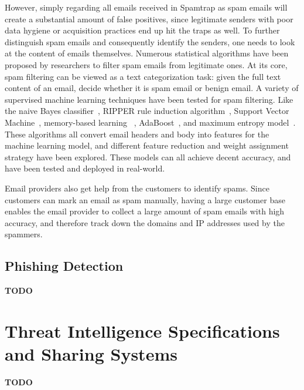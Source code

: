 However, simply regarding all emails received in Spamtrap as spam emails 
will create a substantial amount of false positives, since legitimate senders with poor data hygiene or acquisition practices end up hit the traps as 
well. To further distinguish spam emails and consequently identify the
senders, one needs to look at the content of emails themselves. Numerous 
statistical algorithms have been proposed by researchers to filter spam
emails from legitimate ones. At its core, spam filtering can be viewed as
a text categorization task: given the full text content of an email, 
decide whether it is spam email or benign email. A variety of supervised
machine learning techniques have been tested for spam filtering. Like the
naive Bayes classifier~\cite{androutsopoulos2000evaluation, sahami1998bayesian, schneider2003comparison}, 
RIPPER rule induction algorithm~\cite{cohen1996learning},
Support Vector Machine~\cite{drucker1999support}, memory-based learning
~\cite{androutsopoulos2000learning}, AdaBoost~\cite{carreras2001boosting},
and maximum entropy model~\cite{zhang2003filtering}. These algorithms all
convert email headers and body into features for the machine learning model,
and different feature reduction and weight assignment strategy have been
explored. These models can all achieve decent accuracy, and have been tested
and deployed in real-world. 

Email providers also get help from the customers to identify spams. Since
customers can mark an email as spam manually, having a large customer base
enables the email provider to collect a large amount of spam emails with high
accuracy, and therefore track down the domains and IP addresses used by the 
spammers.

\subsection{Phishing Detection}
\textbf{TODO}



\section{Threat Intelligence Specifications and Sharing Systems}
\textbf{TODO}


